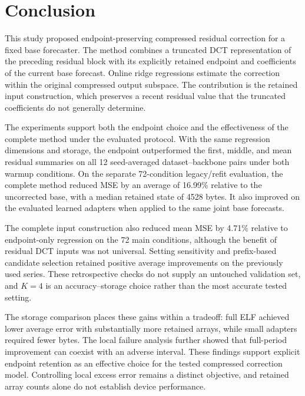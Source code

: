 \section{Conclusion}
\label{sec:conclusion}

This study proposed endpoint-preserving compressed residual correction for a fixed base forecaster. The method combines a truncated DCT representation of the preceding residual block with its explicitly retained endpoint and coefficients of the current base forecast. Online ridge regressions estimate the correction within the original compressed output subspace. The contribution is the retained input construction, which preserves a recent residual value that the truncated coefficients do not generally determine.

The experiments support both the endpoint choice and the effectiveness of the complete method under the evaluated protocol. With the same regression dimensions and storage, the endpoint outperformed the first, middle, and mean residual summaries on all 12 seed-averaged dataset--backbone pairs under both warmup conditions. On the separate 72-condition legacy/refit evaluation, the complete method reduced MSE by an average of 16.99\% relative to the uncorrected base, with a median retained state of 4528 bytes. It also improved on the evaluated learned adapters when applied to the same joint base forecasts.

The complete input construction also reduced mean MSE by 4.71\% relative to endpoint-only regression on the 72 main conditions, although the benefit of residual DCT inputs was not universal. Setting sensitivity and prefix-based candidate selection retained positive average improvements on the previously used series. These retrospective checks do not supply an untouched validation set, and $K=4$ is an accuracy--storage choice rather than the most accurate tested setting.

The storage comparison places these gains within a tradeoff: full ELF achieved lower average error with substantially more retained arrays, while small adapters required fewer bytes. The local failure analysis further showed that full-period improvement can coexist with an adverse interval. These findings support explicit endpoint retention as an effective choice for the tested compressed correction model. Controlling local excess error remains a distinct objective, and retained array counts alone do not establish device performance.
